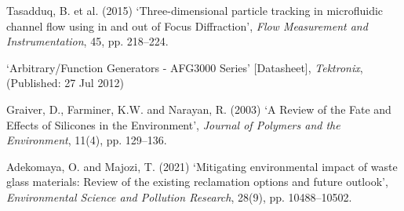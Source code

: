 \documentclass[twoside,twocolumn,9pt,a4paper]{IEEEtran}
\begin{document}
\begin{thebibliography}{99}
 Tasadduq, B. et al. (2015) ‘Three-dimensional particle tracking in microfluidic channel flow using in and out of Focus Diffraction’, \textit{Flow Measurement and Instrumentation}, 45, pp. 218–224. 

 ‘Arbitrary/Function Generators - AFG3000 Series’ [Datasheet], \textit{Tektronix}, (Published: 27 Jul 2012)


 Graiver, D., Farminer, K.W. and Narayan, R. (2003) ‘A Review of the Fate and Effects of Silicones in the Environment’, \textit{Journal of Polymers and the Environment}, 11(4), pp. 129–136. 

 Adekomaya, O. and Majozi, T. (2021) ‘Mitigating environmental impact of waste glass materials: Review of the existing reclamation options and future outlook’, \textit{Environmental Science and Pollution Research}, 28(9), pp. 10488–10502.



\end{thebibliography}
\end{document}
